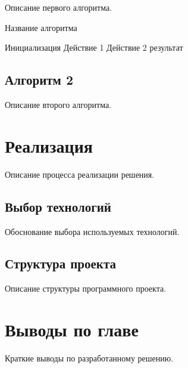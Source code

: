 Описание первого алгоритма.

\begin{algorithm}
\caption{Название алгоритма}
\begin{algorithmic}[1]
\STATE Инициализация
    \STATE Действие 1
    \STATE Действие 2
\ENDWHILE
\RETURN результат
\end{algorithmic}
\end{algorithm}

\subsection{Алгоритм 2}

Описание второго алгоритма.

\section{Реализация}

Описание процесса реализации решения.

\subsection{Выбор технологий}

Обоснование выбора используемых технологий.

\subsection{Структура проекта}

Описание структуры программного проекта.

\section{Выводы по главе}

Краткие выводы по разработанному решению.
